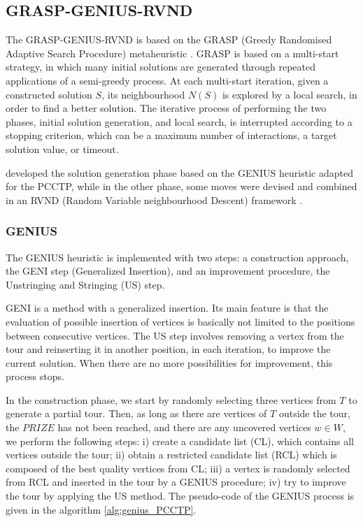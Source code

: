 \documentclass{singlecol-new}
\begin{document}
\subsection{GRASP-GENIUS-RVND}

The GRASP-GENIUS-RVND \citep{daSilva} is based on the GRASP (Greedy Randomised Adaptive Search Procedure) metaheuristic \citep{grasp03}. GRASP is based on a multi-start strategy, in which many initial solutions are generated through repeated applications of a semi-greedy process. At each multi-start iteration, given a constructed solution $S$, its neighbourhood $N(S)$ is explored by a local search, in order to find a better solution. The iterative process of performing the two phases, initial solution generation, and local search, is interrupted according to a stopping criterion, which can be a maximum number of interactions, a target solution value, or timeout.

\citet{daSilva} developed the solution generation phase based on the GENIUS heuristic \citep{genius} adapted for the PCCTP, while in the other phase, some moves were devised and combined in an RVND (Random Variable neighbourhood Descent) framework \citep{mladenovic97}.


\subsubsection{GENIUS}

The GENIUS heuristic \citep{genius} is implemented with  two steps: a construction approach, the GENI step (Generalized Insertion), and an improvement procedure, the Unstringing and Stringing (US) step. 

GENI is a method with a generalized insertion. Its main feature is that the evaluation of possible insertion of vertices is basically not limited to the positions between consecutive vertices.
The US step involves removing a vertex from the tour and reinserting it in another position, in each iteration, to improve the current solution. When there are no more possibilities for improvement, this process stops.


In the construction phase, we start by randomly selecting three vertices from $T$ to generate a partial tour. Then, as long as there are vertices of $T$ outside the tour, the $PRIZE$ has not been reached, and there are any uncovered vertices $w \in W $, we  perform the following steps: i) create a candidate list (CL), which contains all vertices outside the tour; ii) obtain a restricted candidate list (RCL) which is composed of the best quality vertices from CL; iii) a vertex is randomly selected from RCL and inserted in the tour by a GENIUS procedure; iv) try to improve the tour by applying the US method. The pseudo-code of the GENIUS process is given in the algorithm \ref{alg:genius_PCCTP}.
\end{document}
